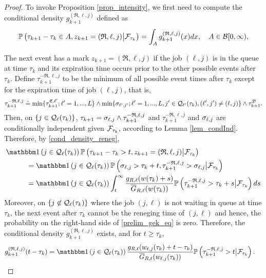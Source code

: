\documentclass{article}
\theoremstyle{definition}
\numberwithin{equation}{section}
\begin{document}
\begin{proof}
To invoke Proposition \ref{prop_intensity}, we first need to compute the conditional density $g^{(\mathfrak{R},\ell,j)}_{k+1}$ defined as
\begin{equation}\label{prelim_gek_eq}
\mathbb{P}\left(\tau_{k+1}-\tau_{k}\in A, z_{k+1}=(\mathfrak{R},\ell,j)\big|\mathcal{F}_{\tau_k}\right)= \int_A g^{(\mathfrak{R},\ell,j)}_{k+1}(x) dx,\quad  A\in\mathcal{B}[0,\infty),
\end{equation}


The next event has a mark $ z_{k+1}=(\mathfrak{R},\ell,j)$ if the job $(\ell,j)$ is in the queue at time $\tau_k$ and its expiration time occurs prior to the other possible events after $\tau_k$. Define $\tau_{k+1}^{-\mathfrak{R},\ell,j}$ to be the minimum of all possible event times after $\tau_k$ except for the expiration time of job $(\ell,j)$, that is,
\[
  \tau_{k+1}^{-\mathfrak{R},\ell,j} \doteq \min\{\tau^{\mathfrak{E},\ell'}_{k+1};\ell'=1,...,L\} \wedge \min\{\sigma_{\ell',j'}; \ell'=1,...,L,j'\in\mathcal{Q}_{\ell'}(\tau_k), (\ell',j')\neq (\ell,j) \} \wedge \tau^{\mathfrak{D}}_{k+1}.
\]
Then, on $\{j\in\mathcal{Q}_\ell(\tau_k)\}$, $\tau_{k+1}= \sigma_{\ell,j} \wedge \tau_{k+1}^{-\mathfrak{R},\ell,j}$ and $\tau_{k+1}^{-\mathfrak{R},\ell,j}$ and $\sigma_{\ell,j}$ are conditionally independent given $\mathcal{F}_{\tau_k}$, according to Lemma \ref{lem_condInd}. Therefore, by \eqref{cond_density_reneg},
\begin{align}\label{prelim_gtemp1}
&\indic{j\in\inque_\ell(\tau_k)}\Prob{\tau_{k+1}-\tau_{k}>t, z_{k+1}=(\mathfrak{R},\ell,j)\big|\filt_{\tau_k}} \notag\\ &\hspace{1cm}=\indic{j\in\inque_\ell(\tau_k)} \Prob{\renegtime_{\ell,j}>\tau_k+t,\tau_{k+1}^{-\mathfrak{R},\ell,j}>\renegtime_{\ell,j} \big|\filt_{\tau_k}}\notag\\
&\hspace{1cm}=\indic{j\in\inque_\ell(\tau_k)} \int_t^\infty \frac{g_{R,\ell}(\waiting(\tau_k)+s)} {\overline G_{R,\ell}(\waiting(\tau_k))} \Prob{\tau_{k+1}^{-\mathfrak{R},\ell,j}>\tau_k+s\big|\filt_{\tau_k}}ds
\end{align}
Moreover, on $\{j\not \in\mathcal{Q}_\ell(\tau_k)\}$ where the job $(j,\ell)$ is not waiting in queue at time $\tau_k$, the next event after $\tau_k$ cannot be the reneging time of $(j,\ell)$ and hence, the probability on the right-hand side of \eqref{prelim_gek_eq} is zero. Therefore, the conditional density $g^{(\mathfrak{R},\ell,j)}_{k+1}$ exists, and for $t\geq \tau_k$,
\begin{align}\label{prelim_gE}
  g^{(\mathfrak{R},\ell,j)}_{k+1}(t-\tau_k)& = \indic{j\in\inque_\ell(\tau_k)} \frac{g_{R,\ell}(\waiting_{\ell,j}(\tau_k)+t-\tau_k)} {\overline G_{R,\ell}(\waiting_{\ell,j}(\tau_k))} \Prob{\tau_{k+1}^{-\mathfrak{R},\ell,j}>t\big|\filt_{\tau_k}}.
\end{align}


\end{proof}
\end{document}
